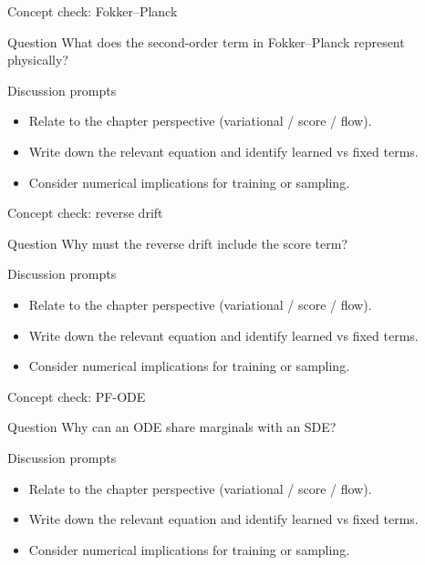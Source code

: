 \documentclass[aspectratio=169]{beamer}
\begin{document}
\begin{frame}{Concept check: Fokker--Planck}
\begin{block}{Question}
What does the second-order term in Fokker--Planck represent physically?
\end{block}
\begin{block}{Discussion prompts}
\begin{itemize}
\item Relate to the chapter perspective (variational / score / flow).
\item Write down the relevant equation and identify learned vs fixed terms.
\item Consider numerical implications for training or sampling.
\end{itemize}
\end{block}
\end{frame}

\begin{frame}{Concept check: reverse drift}
\begin{block}{Question}
Why must the reverse drift include the score term?
\end{block}
\begin{block}{Discussion prompts}
\begin{itemize}
\item Relate to the chapter perspective (variational / score / flow).
\item Write down the relevant equation and identify learned vs fixed terms.
\item Consider numerical implications for training or sampling.
\end{itemize}
\end{block}
\end{frame}

\begin{frame}{Concept check: PF-ODE}
\begin{block}{Question}
Why can an ODE share marginals with an SDE?
\end{block}
\begin{block}{Discussion prompts}
\begin{itemize}
\item Relate to the chapter perspective (variational / score / flow).
\item Write down the relevant equation and identify learned vs fixed terms.
\item Consider numerical implications for training or sampling.
\end{itemize}
\end{block}
\end{frame}
\end{document}
